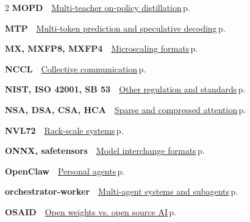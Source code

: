 \documentclass[10pt,a4paper,openany]{report}
\begin{document}
\begin{multicols}{2}
\textbf{\sffamily\color{accent}MOPD}\ \ \hyperref[c:reasoning-3]{Multi-teacher on-policy distillation}\,{\color{muted}\scriptsize p.\,\pageref{c:reasoning-3}}\par\vspace{2pt}
\textbf{\sffamily\color{accent}MTP}\ \ \hyperref[c:arch-6]{Multi-token prediction and speculative decoding}\,{\color{muted}\scriptsize p.\,\pageref{c:arch-6}}\par\vspace{2pt}
\textbf{\sffamily\color{accent}MX, MXFP8, MXFP4}\ \ \hyperref[c:quant-0]{Microscaling formats}\,{\color{muted}\scriptsize p.\,\pageref{c:quant-0}}\par\vspace{2pt}
\textbf{\sffamily\color{accent}NCCL}\ \ \hyperref[c:hardware-14]{Collective communication}\,{\color{muted}\scriptsize p.\,\pageref{c:hardware-14}}\par\vspace{2pt}
\textbf{\sffamily\color{accent}NIST, ISO 42001, SB 53}\ \ \hyperref[c:safety-12]{Other regulation and standards}\,{\color{muted}\scriptsize p.\,\pageref{c:safety-12}}\par\vspace{2pt}
\textbf{\sffamily\color{accent}NSA, DSA, CSA, HCA}\ \ \hyperref[c:arch-2]{Sparse and compressed attention}\,{\color{muted}\scriptsize p.\,\pageref{c:arch-2}}\par\vspace{2pt}
\textbf{\sffamily\color{accent}NVL72}\ \ \hyperref[c:hardware-0]{Rack-scale systems}\,{\color{muted}\scriptsize p.\,\pageref{c:hardware-0}}\par\vspace{2pt}
\textbf{\sffamily\color{accent}ONNX, safetensors}\ \ \hyperref[c:hardware-15]{Model interchange formats}\,{\color{muted}\scriptsize p.\,\pageref{c:hardware-15}}\par\vspace{2pt}
\textbf{\sffamily\color{accent}OpenClaw}\ \ \hyperref[c:agents-10]{Personal agents}\,{\color{muted}\scriptsize p.\,\pageref{c:agents-10}}\par\vspace{2pt}
\textbf{\sffamily\color{accent}orchestrator-worker}\ \ \hyperref[c:agents-7]{Multi-agent systems and subagents}\,{\color{muted}\scriptsize p.\,\pageref{c:agents-7}}\par\vspace{2pt}
\textbf{\sffamily\color{accent}OSAID}\ \ \hyperref[c:practice-7]{Open weights vs. open source AI}\,{\color{muted}\scriptsize p.\,\pageref{c:practice-7}}\par\vspace{2pt}

\end{multicols}
\end{document}
